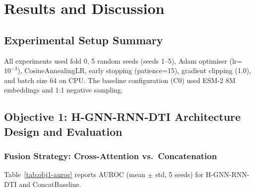\documentclass[12pt,a4paper,oneside]{report}
\begin{document}
\chapter{Results and Discussion}

\section{Experimental Setup Summary}

All experiments used fold 0, 5 random seeds (seeds 1--5), Adam optimiser (lr=$10^{-3}$), CosineAnnealingLR, early stopping (patience=15), gradient clipping (1.0), and batch size 64 on CPU. The baseline configuration (C0) used ESM-2 8M embeddings and 1:1 negative sampling.

\section{Objective 1: H-GNN-RNN-DTI Architecture Design and Evaluation}

\subsection{Fusion Strategy: Cross-Attention vs.\ Concatenation}

Table~\ref{tab:obj1-auroc} reports AUROC (mean $\pm$ std, 5 seeds) for H-GNN-RNN-DTI and ConcatBaseline.
\end{document}
